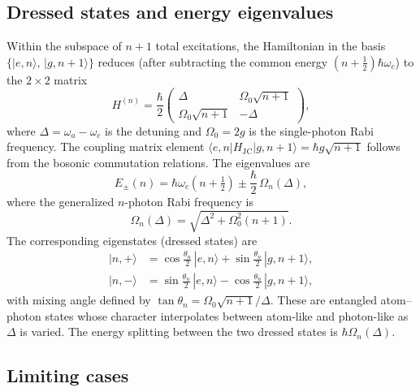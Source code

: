 \documentclass{iopjournal}
\begin{document}
\subsection{Dressed states and energy eigenvalues}
\label{sec:dressed}

Within the subspace of $n{+}1$ total excitations, the Hamiltonian in the basis $\{|e, n\rangle,\, |g, n{+}1\rangle\}$ reduces (after subtracting the common energy $(n + \tfrac{1}{2})\hbar\omega_c$) to the $2 \times 2$ matrix
\begin{equation}
H^{(n)} = \frac{\hbar}{2}
\begin{pmatrix}
\Delta & \Omega_0\sqrt{n+1} \\
\Omega_0\sqrt{n+1} & -\Delta
\end{pmatrix},
\label{eq:2x2}
\end{equation}
where $\Delta = \omega_a - \omega_c$ is the detuning and $\Omega_0 = 2g$ is the single-photon Rabi frequency. The coupling matrix element $\langle e, n | H_{\text{JC}} | g, n{+}1\rangle = \hbar g\sqrt{n+1}$ follows from the bosonic commutation relations. The eigenvalues are
\begin{equation}
E_{\pm}(n) = \hbar\omega_c\left(n + \tfrac{1}{2}\right) \pm \frac{\hbar}{2}\,\Omega_n(\Delta),
\label{eq:eigenvalues}
\end{equation}
where the generalized $n$-photon Rabi frequency is
\begin{equation}
\Omega_n(\Delta) = \sqrt{\Delta^2 + \Omega_0^2(n+1)}.
\label{eq:gen_rabi}
\end{equation}
The corresponding eigenstates (dressed states) are
\begin{align}
|n,+\rangle &= \cos\tfrac{\theta_n}{2}\, |e,n\rangle + \sin\tfrac{\theta_n}{2}\, |g,n{+}1\rangle, \label{eq:dressed_plus}\\
|n,-\rangle &= \sin\tfrac{\theta_n}{2}\, |e,n\rangle - \cos\tfrac{\theta_n}{2}\, |g,n{+}1\rangle, \label{eq:dressed_minus}
\end{align}
with mixing angle defined by $\tan\theta_n = \Omega_0\sqrt{n+1}/\Delta$. These are entangled atom--photon states whose character interpolates between atom-like and photon-like as $\Delta$ is varied. The energy splitting between the two dressed states is $\hbar\Omega_n(\Delta)$.


\subsection{Limiting cases}
\label{sec:limits}
\end{document}
